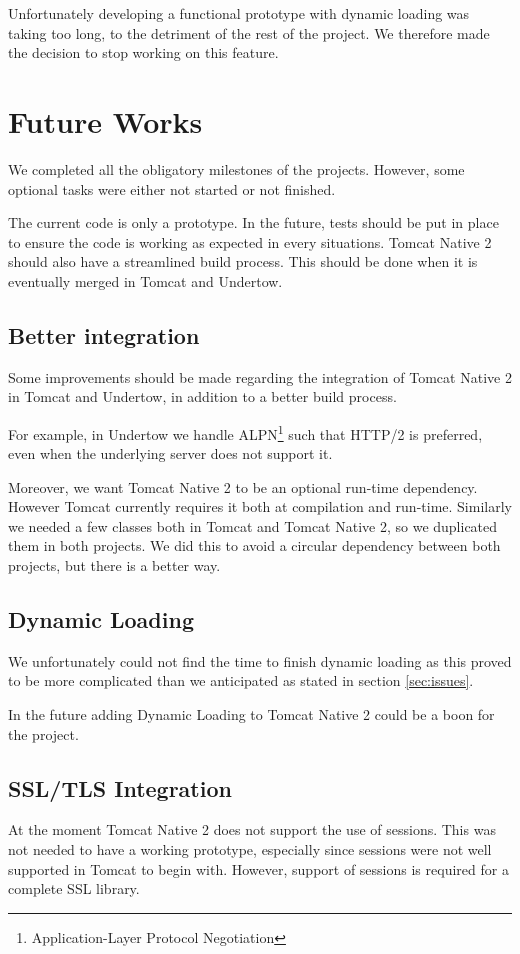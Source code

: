 \documentclass[11pt,a4paper,bibliography=totocnumbered]{scrartcl}
\def\mytitle{Tomcat Native 2}
\begin{document}
 Unfortunately developing a functional prototype with dynamic loading was taking too long, to the detriment of the rest of the project. We therefore made the decision to stop working on this feature.

\section{Future Works}
We completed all the obligatory milestones of the projects. However, some optional tasks were either not started or not finished.

The current code is only a prototype. In the future, tests should be put in place to ensure the code is working as expected in every situations. \mytitle{} should also have a streamlined build process. This should be done when it is eventually merged in Tomcat and Undertow.

\subsection{Better integration}
Some improvements should be made regarding the integration of \mytitle{} in Tomcat and Undertow, in addition to a better build process.

For example, in Undertow we handle ALPN\footnote{Application-Layer Protocol Negotiation} such that HTTP/2 is preferred, even when the underlying server does not support it.

Moreover, we want \mytitle{} to be an optional run-time dependency. However Tomcat currently requires it both at compilation and run-time. Similarly we needed a few classes both in Tomcat and \mytitle{}, so we duplicated them in both projects. We did this to avoid a circular dependency between both projects, but there is a better way.

\subsection{Dynamic Loading}
We unfortunately could not find the time to finish dynamic loading as this proved to be more complicated than we anticipated as stated in section \ref{sec:issues}.

In the future adding Dynamic Loading to \mytitle{} could be a boon for the project.

\subsection{SSL/TLS Integration}
At the moment \mytitle{} does not support the use of sessions. This was not needed to have a working prototype, especially since sessions were not well supported in Tomcat to begin with. However, support of sessions is required for a complete SSL library.
\end{document}

